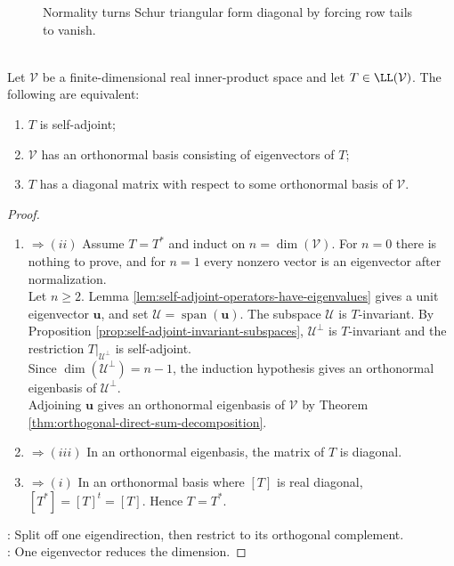 \begin{figure}[H]
  \centering
  
\caption{Normality turns Schur triangular form diagonal by forcing row tails to vanish.}
  \label{fig:spectral-theorem-triangular-to-diagonal}
\end{figure}

\begin{theorem} \label{thm:real-spectral-theorem} \\
Let $\mathcal{V}$ be a finite-dimensional real inner-product space and let $T\in\LL(\mathcal{V})$. The following are equivalent:
\begin{enumerate}[label=\roman*.]
\setlength{\itemsep}{0pt}
\item $T$ is self-adjoint;
\item $\mathcal{V}$ has an orthonormal basis consisting of eigenvectors of $T$;
\item $T$ has a diagonal matrix with respect to some orthonormal basis of $\mathcal{V}$.
\end{enumerate}
\begin{proof}
\begin{enumerate}[label=(\roman*).]
\setlength{\itemsep}{0pt}
\item[$(i)$]$\Rightarrow (ii)$
Assume $T=T^*$ and induct on $n=\dim(\mathcal{V})$. For $n=0$ there is nothing to prove, and for $n=1$ every nonzero vector is an eigenvector after normalization.\\
Let $n\geq2$. Lemma \ref{lem:self-adjoint-operators-have-eigenvalues} gives a unit eigenvector $\mathbf{u}$, and set $\mathcal{U}=\operatorname{span}(\mathbf{u})$. The subspace $\mathcal{U}$ is $T$-invariant. By Proposition \ref{prop:self-adjoint-invariant-subspaces}, $\mathcal{U}^{\perp}$ is $T$-invariant and the restriction $T|_{\mathcal{U}^{\perp}}$ is self-adjoint.\\
Since $\dim(\mathcal{U}^{\perp})=n-1$, the induction hypothesis gives an orthonormal eigenbasis of $\mathcal{U}^{\perp}$.\\
Adjoining $\mathbf{u}$ gives an orthonormal eigenbasis of $\mathcal{V}$ by Theorem \ref{thm:orthogonal-direct-sum-decomposition}.
\item[$(ii)$]$\Rightarrow (iii)$
In an orthonormal eigenbasis, the matrix of $T$ is diagonal.
\item[$(iii)$]$\Rightarrow (i)$
In an orthonormal basis where $[T]$ is real diagonal, $[T^*]=[T]^t=[T]$. Hence $T=T^*$.
\end{enumerate}
: Split off one eigendirection, then restrict to its orthogonal complement.\\
: One eigenvector reduces the dimension.
\end{proof}
\end{theorem}

